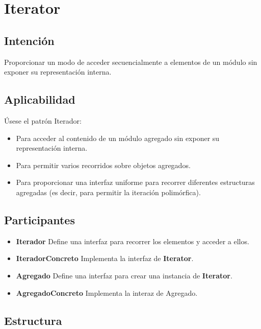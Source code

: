 \section{Iterator}
\label{patronIterator}

\subsection*{Intención}
Proporcionar un modo de acceder secuencialmente a elementos de un módulo sin exponer su representación interna.

\subsection*{Aplicabilidad}

Úsese el patrón Iterador:
\begin{itemize}
\item Para acceder al contenido de un módulo agregado sin exponer su representación interna.
\item Para permitir varios recorridos sobre objetos agregados.
\item Para proporcionar una interfaz uniforme para recorrer diferentes estructuras agregadas (es decir, para permitir la iteración polimórfica).

\end{itemize}


\subsection*{Participantes}

\begin{itemize}
\item \textbf{Iterador} Define una interfaz para recorrer los elementos y acceder a ellos.

\item \textbf{IteradorConcreto} Implementa la interfaz de \textbf{Iterator}.

\item \textbf{Agregado} Define una interfaz para crear una instancia de \textbf{Iterator}.

\item \textbf{AgregadoConcreto} Implementa la interaz de Agregado.

\end{itemize}


\subsection*{Estructura}


